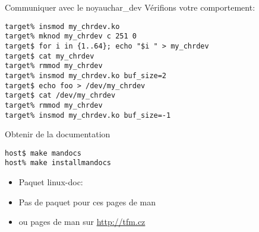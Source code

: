 \begin{frame}[fragile=singleslide]{Communiquer avec le noyau}{char\_dev}
   Vérifions votre comportement:
   \begin{lstlisting}
target% insmod my_chrdev.ko
target% mknod my_chrdev c 251 0
target$ for i in {1..64}; echo "$i " > my_chrdev
target$ cat my_chrdev
target% rmmod my_chrdev
target% insmod my_chrdev.ko buf_size=2
target$ echo foo > /dev/my_chrdev
target$ cat /dev/my_chrdev
target% rmmod my_chrdev
target% insmod my_chrdev.ko buf_size=-1
    \end{lstlisting} %
\end{frame}
 


\begin{frame}[fragile=singleslide]{Obtenir de la documentation}
  \begin{lstlisting}
host$ make mandocs
host% make installmandocs
  \end{lstlisting}  %
  \begin{itemize}
    \item Paquet linux-doc: 
    \item Pas de paquet pour ces pages de man 
    \item ou pages de man sur \url{http://tfm.cz}
  \end{itemize}
\end{frame}



